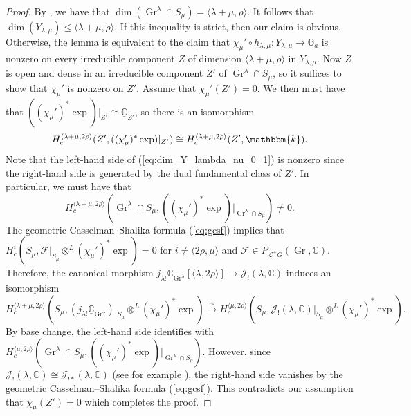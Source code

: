 \documentclass{amsart}
\newcommand{\C}{\mathbb{C}}
\renewcommand{\L}{\mathcal{L}}
\newcommand{\G}{\mathbb{G}}
\renewcommand{\k}{\mathbbm{k}}
\newcommand{\scrF}{\mathcal{F}}
\newcommand{\scrJ}{\mathcal{J}}
\DeclareMathOperator{\Gr}{Gr}
\theoremstyle{definition}
\begin{document}
\begin{proof}
        By \cite[Theorem 3.2]{MV}, we have that $\dim (\Gr^{\lambda} \cap S_{\mu}) = \langle \lambda + \mu, \rho \rangle$. It follows that $\dim (Y_{\lambda, \mu}) \leq \langle \lambda + \mu, \rho \rangle$.
        If this inequality is strict, then our claim is obvious. 
        Otherwise, the lemma is equivalent to the claim that $\chi_{\mu}' \circ h_{\lambda, \mu} : Y_{\lambda, \mu} \to \G_a$ is nonzero on every irreducible component $Z$ of dimension $\langle \lambda + \mu ,\rho \rangle$ in $Y_{\lambda, \mu}$.
        Now $Z$ is open and dense in an irreducible component $Z'$ of $\Gr^{\lambda} \cap S_{\mu}$, so it suffices to show that $\chi_{\mu}'$ is nonzero on $Z'$.
        Assume that $\chi_{\mu}' (Z') = 0$. We then must have that $((\chi_{\mu}')^* \exp)\vert_{Z'} \cong \underline{\C}_{Z'}$, so there is an isomorphism
        \begin{equation}\label{eq:dim_Y_lambda_nu_0_1}
            H_c^{\langle \lambda + \mu, 2\rho \rangle} (Z', ((\chi_{\mu}')^* \exp)\vert_{Z'}) \cong H_c^{\langle \lambda + \mu, 2\rho \rangle} (Z', \k).
        \end{equation}
        Note that the left-hand side of (\ref{eq:dim_Y_lambda_nu_0_1}) is nonzero since the right-hand side is generated by the dual fundamental class of $Z'$.
        In particular, we must have that 
        \[H_c^{\langle \lambda + \mu, 2\rho \rangle} (\Gr^{\lambda} \cap S_{\mu}, ((\chi_{\mu}')^* \exp) \vert_{\Gr^{\lambda} \cap S_{\mu}}) \neq 0.\]
        The geometric Casselman--Shalika formula (\ref{eq:gcsf}) implies that $H_c^i (S_{\mu}, \scrF\vert_{S_{\mu}} \otimes^L (\chi_{\mu}')^* \exp) = 0$ for $i \neq \langle 2\rho, \mu \rangle$ and $\scrF \in P_{\L^+ G} (\Gr, \C)$.
        Therefore, the canonical morphism $j_{\lambda !} \underline{\C}_{\Gr^{\lambda}} [\langle \lambda, 2\rho \rangle]\to \scrJ_! (\lambda, \C)$ induces an isomorphism
        \[H_c^{\langle \lambda + \mu, 2\rho \rangle} (S_{\mu}, (j_{\lambda !} \underline{\C}_{\Gr^{\lambda}})\vert_{S_{\mu}} \otimes^L (\chi_{\mu}')^* \exp) \stackrel{\sim}{\to} H_c^{\langle \mu, 2\rho \rangle} (S_{\mu}, \scrJ_! (\lambda, \C)\vert_{S_{\mu}} \otimes^L (\chi_{\mu}')^* \exp). \]
        By base change, the left-hand side identifies with $H_c^{\langle \mu, 2\rho \rangle} (\Gr^{\lambda} \cap S_{\mu}, ((\chi_{\mu}')^* \exp)\vert_{\Gr^{\lambda} \cap S_{\mu}})$.
        However, since $\scrJ_! (\lambda, \C) \cong \scrJ_{!*} (\lambda, \C)$ (see for example \cite[Proposition 1]{Ga01}), the right-hand side vanishes by the geometric Casselman--Shalika formula (\ref{eq:gcsf}).
        This contradicts our assumption that $\chi_{\mu} (Z') = 0$ which completes the proof.
    \end{proof}
\end{document}
